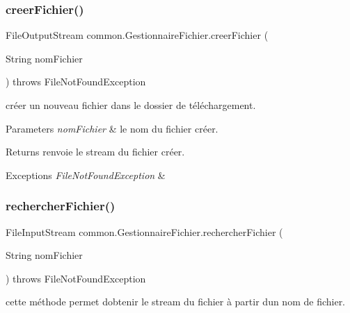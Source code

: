 \subsubsection{\texorpdfstring{creer\+Fichier()}{creerFichier()}}
{\footnotesize\ttfamily File\+Output\+Stream common.\+Gestionnaire\+Fichier.\+creer\+Fichier (\begin{DoxyParamCaption}\item[{String}]{nom\+Fichier }\end{DoxyParamCaption}) throws File\+Not\+Found\+Exception\hspace{0.3cm}{\ttfamily [inline]}}



créer un nouveau fichier dans le dossier de téléchargement. 


\begin{DoxyParams}{Parameters}
{\em nom\+Fichier} & le nom du fichier créer. \\
\hline
\end{DoxyParams}
\begin{DoxyReturn}{Returns}
renvoie le stream du fichier créer. 
\end{DoxyReturn}

\begin{DoxyExceptions}{Exceptions}
{\em File\+Not\+Found\+Exception} & \\
\hline
\end{DoxyExceptions}
\mbox{\label{classcommon_1_1GestionnaireFichier_a55da4571d743ce9ee31a96bd04de9aa4}} 
\subsubsection{\texorpdfstring{rechercher\+Fichier()}{rechercherFichier()}}
{\footnotesize\ttfamily File\+Input\+Stream common.\+Gestionnaire\+Fichier.\+rechercher\+Fichier (\begin{DoxyParamCaption}\item[{String}]{nom\+Fichier }\end{DoxyParamCaption}) throws File\+Not\+Found\+Exception\hspace{0.3cm}{\ttfamily [inline]}}



cette méthode permet d\textquotesingle{}obtenir le stream du fichier à partir d\textquotesingle{}un nom de fichier. 


